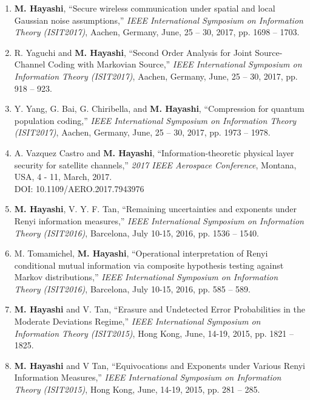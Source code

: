 \documentclass[a4paper,12pt,oneside]{article}
\begin{document}
\begin{enumerate}
\item 
\textbf{M. Hayashi},
``Secure wireless communication under spatial and local Gaussian noise assumptions,''
{\em IEEE International Symposium on Information Theory (ISIT2017)}, 
Aachen, Germany, June, 25 -- 30, 2017, pp. 1698 -- 1703.

\item 
R. Yaguchi and \textbf{M. Hayashi},
``Second Order Analysis for Joint Source-Channel Coding with Markovian Source,''
{\em IEEE International Symposium on Information Theory (ISIT2017)}, 
Aachen, Germany, June, 25 -- 30, 2017, pp. 918 -- 923.

\item 
Y. Yang, G. Bai, G. Chiribella, and \textbf{M. Hayashi},
``Compression for quantum population coding,''
{\em IEEE International Symposium on Information Theory (ISIT2017)}, 
Aachen, Germany, June, 25 -- 30, 2017, pp. 1973 -- 1978.

\item 
A. Vazquez Castro and \textbf{M. Hayashi}, ``Information-theoretic physical layer security for satellite channels,'' 
{\em 2017 IEEE Aerospace Conference}, Montana, USA, 4 - 11, March, 2017.\\
DOI: 10.1109/AERO.2017.7943976

\item 
\textbf{M. Hayashi}, V. Y. F. Tan, ``Remaining uncertainties and exponents under Renyi information measures,'' 
{\em IEEE International Symposium on Information Theory (ISIT2016)}, 
Barcelona, July 10-15, 2016, pp. 1536 -- 1540.

\item 
M. Tomamichel, \textbf{M. Hayashi}, ``Operational interpretation of Renyi conditional mutual information via composite hypothesis testing against Markov distributions,'' 
{\em IEEE International Symposium on Information Theory (ISIT2016)}, 
Barcelona, July 10-15, 2016, pp. 585 -- 589.

\item 
\textbf{M. Hayashi} and V. Tan, 
``Erasure and Undetected Error Probabilities in the Moderate Deviations Regime,'' 
{\em IEEE International Symposium on Information Theory (ISIT2015)},
Hong Kong, June, 14-19, 2015, pp. 1821 -- 1825.

\item 
\textbf{M. Hayashi} and V Tan, 
``Equivocations and Exponents under Various Renyi Information Measures,'' 
{\em IEEE International Symposium on Information Theory (ISIT2015)},
Hong Kong, June, 14-19, 2015, pp. 281 -- 285.


\end{enumerate}
\end{document}
